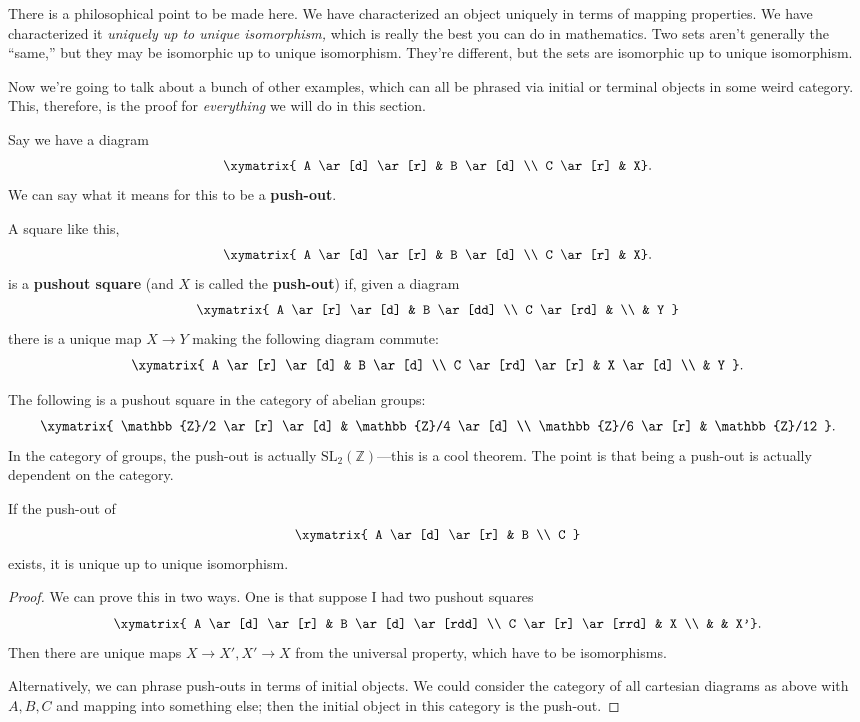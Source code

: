 There is a philosophical point to be made here. We have characterized an object
uniquely in terms of mapping properties. We have characterized it
\emph{uniquely up to unique isomorphism,} which is really the best you can do
in mathematics. Two sets aren't generally the ``same,'' but they may be
isomorphic up to unique isomorphism. They're different,
but the sets are isomorphic up
to unique isomorphism.

Now we're going to talk about a bunch of other examples, which can all be
phrased via initial or terminal objects in some weird category. This,
therefore, is the proof for \emph{everything} we will do in this section.

Say we have a diagram
\[
\xymatrix{
A \ar[d] \ar[r] &  B \ar[d] \\
C \ar[r] &  X}.
\]
We can say what it means for this to be a \textbf{push-out}.

\begin{definition}
A square like this,
\[
\xymatrix{
A \ar[d] \ar[r] &  B \ar[d] \\
C \ar[r] &  X}.
\]
is a \textbf{pushout square} (and $X$ is called the \textbf{push-out}) if,
given a diagram
\[ \xymatrix{
A \ar[r] \ar[d]  &  B \ar[dd] \\
C \ar[rd] & \\
& Y
}\]
there is a unique map $X \to Y$ making the following diagram commute:
\[ \xymatrix{
A \ar[r] \ar[d]  &  B \ar[d] \\
C \ar[rd] \ar[r] & X  \ar[d]  \\
& Y
}.\]
\end{definition}

\begin{example}
The following is a pushout square in the category of abelian groups:
\[ \xymatrix{
\mathbb{Z}/2 \ar[r] \ar[d]  &  \mathbb{Z}/4 \ar[d]  \\
\mathbb{Z}/6 \ar[r] &  \mathbb{Z}/12
}.\]
In the category of groups, the push-out is actually
$\mathrm{SL}_2(\mathbb{Z})$---this is a cool theorem. The point is that being a
push-out is actually dependent on the category.
\end{example}

\begin{proposition}
If the push-out of
\[ \xymatrix{
A \ar[d] \ar[r] & B \\
C
}\]
exists, it is unique up to unique isomorphism.
\end{proposition}
\begin{proof}
We can prove this in two ways. One is that suppose I had two pushout squares
\[
\xymatrix{
A \ar[d] \ar[r] &  B \ar[d] \ar[rdd] \\
C \ar[r] \ar[rrd] &  X \\
& & X'}.
\]
Then there are unique maps $X \to X', X' \to X$ from the universal property,
which have to be isomorphisms.

Alternatively, we can phrase push-outs in terms of initial objects. We could
consider the category of all cartesian diagrams as above with $A,B,C$ and
mapping into something else; then the initial
object in this category is the push-out.
\end{proof}

